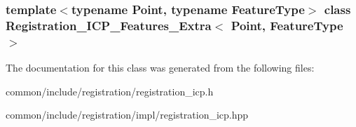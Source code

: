 \subsubsection*{template$<$typename Point, typename FeatureType$>$ class Registration\_\-ICP\_\-Features\_\-Extra$<$ Point, FeatureType $>$}



The documentation for this class was generated from the following files:\begin{DoxyCompactItemize}
\item 
common/include/registration/registration\_\-icp.h\item 
common/include/registration/impl/registration\_\-icp.hpp\end{DoxyCompactItemize}
